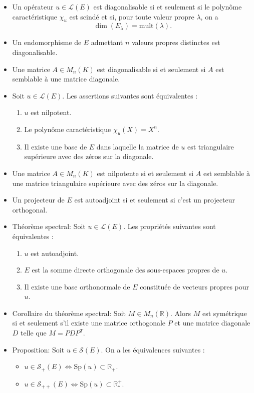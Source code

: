 \documentclass{article}
\begin{document}
\begin{itemize}[label=$\ast$]
\item Un opérateur $u \in \mathcal{L}(E)$ est diagonalisable si et seulement si le polynôme caractéristique $\chi_u$ est scindé et si, pour toute valeur propre $\lambda$, on a \[\dim(E_{\lambda}) = \text{mult}(\lambda).\]

\item Un endomorphisme de $E$ admettant $n$ valeurs propres distinctes est diagonalisable.

\item Une matrice $A \in M_n(K)$ est diagonalisable si et seulement si $A$ est semblable à une matrice diagonale.

\item Soit $u \in \mathcal{L}(E)$. Les assertions suivantes sont équivalentes :
\begin{enumerate}
    \item $u$ est nilpotent.
    \item Le polynôme caractéristique $\chi_u(X) = X^n$.
    \item Il existe une base de $E$ dans laquelle la matrice de $u$ est triangulaire supérieure avec des zéros sur la diagonale.
\end{enumerate}

\item Une matrice $A \in M_n(K)$ est nilpotente si et seulement si $A$ est semblable à une matrice triangulaire supérieure avec des zéros sur la diagonale.

\item Un projecteur de $E$ est autoadjoint si et seulement si c'est un projecteur orthogonal.


\item Théorème spectral: Soit $u \in \mathcal{L}(E)$. Les propriétés suivantes sont équivalentes :
\begin{enumerate}
    \item $u$ est autoadjoint.
    \item $E$ est la somme directe orthogonale des sous-espaces propres de $u$.
    \item Il existe une base orthonormale de $E$ constituée de vecteurs propres pour $u$.
\end{enumerate}

\item Corollaire du théorème spectral: Soit $M \in M_n(\mathbb{R})$. Alors $M$ est symétrique si et seulement s'il existe une matrice orthogonale $P$ et une matrice diagonale $D$ telle que $M = PDP^T$.

\item Proposition: Soit $u \in \mathcal{S}(E)$. On a les équivalences suivantes :
\begin{itemize}
    \item $u \in \mathcal{S}_+(E) \iff \text{Sp}(u) \subset \mathbb{R}_+$.
    \item $u \in \mathcal{S}_{++}(E) \iff \text{Sp}(u) \subset \mathbb{R}_*^+$.
\end{itemize}


\end{itemize}
\end{document}
